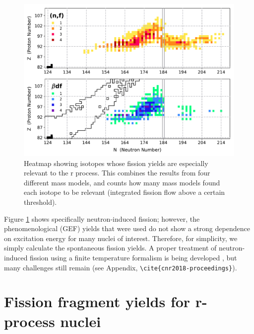 \begin{figure}
	\centering
	\includegraphics[width=0.7\linewidth]{TeX_files/rProc_important-fissions}
	\caption[Isotopes whose fission yields are especially relevant to the r process]{Heatmap showing isotopes whose fission yields are especially relevant to the r process. This combines the results from four different mass models, and counts how many mass models found each isotope to be relevant (integrated fission flow above a certain threshold). \cite{Vassh2018}}
	\label{fig:rprocimportant-fissions}
\end{figure}

Figure \ref{fig:rprocimportant-fissions} shows specifically neutron-induced fission; however, the phenomenological (GEF) yields that were used do not show a strong dependence on excitation energy for many nuclei of interest. Therefore, for simplicity, we simply calculate the spontaneous fission yields. A proper treatment of neutron-induced fission using a finite temperature formalism is being developed \cite{Mcdonnell2014, Schunck2014, Schunck2015b}, but many challenges still remain (see Appendix, \verb|\cite{cnr2018-proceedings}|).


\section{Fission fragment yields for r-process nuclei}

